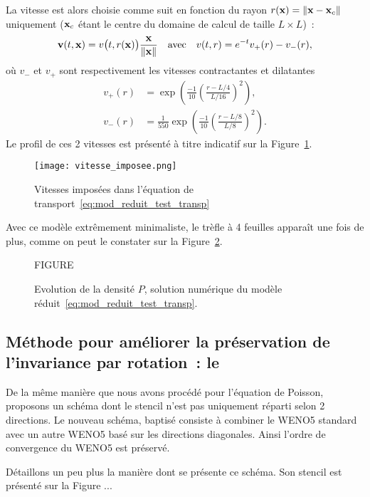 \documentclass[main.tex]{subfiles}
\begin{document}
La vitesse est alors choisie comme suit en fonction du rayon $r(\mathbf{x})=\| \mathbf{x} - \mathbf{x}_c \|$ uniquement ($\mathbf{x}_c$ étant le centre du domaine de calcul de taille $L\times L$)~:
\begin{equation}
\mathbf{v}(t,\mathbf{x})=v\big(t,r(\mathbf{x})\big)\frac{\mathbf{x}}{\|\mathbf{x} \|} \quad \textrm{avec} \quad v(t,r) = e^{-t} v_+(r) - v_-(r),
\end{equation}
où $v_-$ et $v_+$ sont respectivement les vitesses contractantes et dilatantes
\begin{align}
v_+(r)&=\exp\left( \frac{-1}{10} \left(\frac{r-L/4}{L/16} \right)^2 \right), \\
v_-(r)&= \frac{1}{550} \exp\left( \frac{-1}{10} \left(\frac{r-L/8}{L/8} \right)^2 \right).
\end{align}
Le profil de ces 2 vitesses est présenté à titre indicatif sur la Figure~\ref{fig:vitesse+et-imposees}.
\begin{figure}
\centering
\texttt{[image: vitesse\_imposee.png]}
\caption{Vitesses imposées dans l'équation de transport~\eqref{eq:mod_reduit_test_transp}\label{fig:vitesse+et-imposees} }
\end{figure}
Avec ce modèle extrêmement minimaliste, le trèfle à 4 feuilles apparaît une fois de plus, comme on peut le constater sur la Figure~\ref{fig:evo_test_transp}.
\begin{figure}
FIGURE
\caption{Evolution de la densité $P$, solution numérique du modèle réduit~\eqref{eq:mod_reduit_test_transp}.\label{fig:evo_test_transp}}
\end{figure}

\subsection{Méthode pour améliorer la préservation de l'invariance par rotation~: le \twinweno}
De la même manière que nous avons procédé pour l'équation de Poisson, proposons un schéma dont le stencil n'est pas uniquement réparti selon 2 directions. Le nouveau schéma, baptisé \twinweno consiste à combiner le WENO5 standard avec un autre WENO5 basé sur les directions diagonales. Ainsi l'ordre de convergence du WENO5 est préservé.

Détaillons un peu plus la manière dont se présente ce schéma. Son stencil est présenté sur la Figure ...
\end{document}
